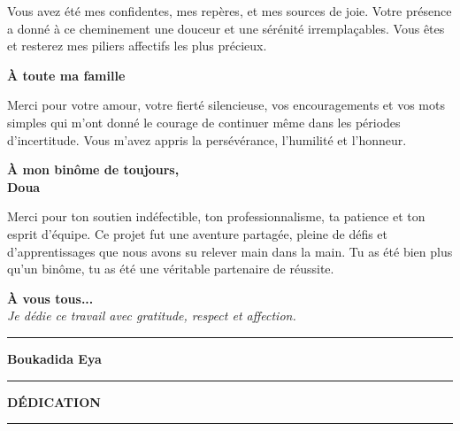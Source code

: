 \documentclass[a4paper,11pt]{report}
\begin{document}
\vspace{0.3cm}
\noindent
Vous avez été mes confidentes, mes repères, et mes sources de joie. Votre présence a donné à ce cheminement une douceur et une sérénité irremplaçables. Vous êtes et resterez mes piliers affectifs les plus précieux.

\vspace{0.5cm}

\begin{center}
    \textbf{\Large À toute ma famille}
\end{center}

\vspace{0.3cm}

\noindent
Merci pour votre amour, votre fierté silencieuse, vos encouragements et vos mots simples qui m’ont donné le courage de continuer même dans les périodes d'incertitude. Vous m’avez appris la persévérance, l’humilité et l’honneur.

\vspace{0.2cm}
\begin{center}
    \textbf{\Large À mon binôme de toujours,}\\[0.2cm]
    \textbf{\LARGE Doua}
\end{center}
\vspace{0.3cm}
\noindent
Merci pour ton soutien indéfectible, ton professionnalisme, ta patience et ton esprit d’équipe. Ce projet fut une aventure partagée, pleine de défis et d’apprentissages que nous avons su relever main dans la main. Tu as été bien plus qu’un binôme, tu as été une véritable partenaire de réussite.

\vspace{0.5cm}
\begin{center}
    \textbf{\large À vous tous...}\\[0.3cm]
    \textit{Je dédie ce travail avec gratitude, respect et affection.}
\end{center}
\vspace{0.5cm}
\noindent\rule{\linewidth}{0.4pt} %

\vspace{0.2cm}
\noindent\textbf{Boukadida Eya} %
\thispagestyle{empty}

\vspace*{1.5cm}

\begin{center}
    \rule{\linewidth}{0.5pt}
    \vspace{0.5cm}

    {\LARGE \textbf{DÉDICATION}}

    \vspace{0.5cm}
    \rule{\linewidth}{0.5pt}
\end{center}
\end{document}
